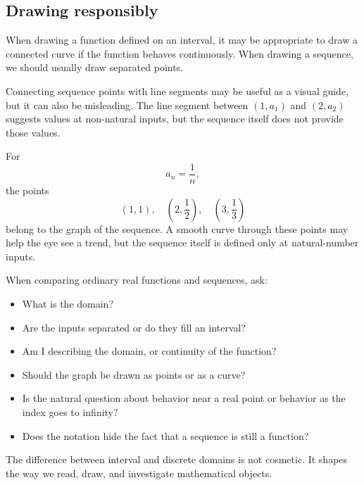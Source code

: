 \subsection*{Drawing responsibly}

When drawing a function defined on an interval, it may be appropriate to draw a connected curve if the function behaves continuously. When drawing a sequence, we should usually draw separated points.

Connecting sequence points with line segments may be useful as a visual guide, but it can also be misleading. The line segment between \((1,a_1)\) and \((2,a_2)\) suggests values at non-natural inputs, but the sequence itself does not provide those values.

\begin{examplebox}
For
\[
a_n=\frac1n,
\]
the points
\[
\left(1,1\right),
\quad
\left(2,\frac12\right),
\quad
\left(3,\frac13\right)
\]
belong to the graph of the sequence. A smooth curve through these points may help the eye see a trend, but the sequence itself is defined only at natural-number inputs.
\end{examplebox}

\begin{summarybox}
When comparing ordinary real functions and sequences, ask:
\begin{itemize}
\item What is the domain?
\item Are the inputs separated or do they fill an interval?
\item Am I describing the domain, or continuity of the function?
\item Should the graph be drawn as points or as a curve?
\item Is the natural question about behavior near a real point or behavior as the index goes to infinity?
\item Does the notation hide the fact that a sequence is still a function?
\end{itemize}
\end{summarybox}

The difference between interval and discrete domains is not cosmetic. It shapes the way we read, draw, and investigate mathematical objects.
